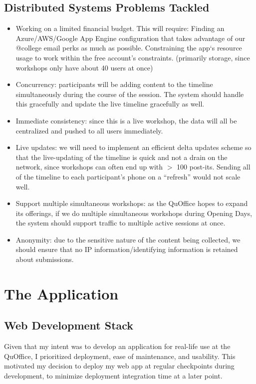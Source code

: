 \documentclass[12pt] {article}
\begin{document}
\subsection{Distributed Systems Problems Tackled}

\begin{itemize}
    \item Working on a limited financial budget. This will require: 
Finding an Azure/AWS/Google App Engine configuration that takes advantage of our @college email perks as much as possible. 
Constraining the app`s resource usage to work within the free account’s constraints. (primarily storage, since workshops only have about 40 users at once) 
    \item Concurrency: participants will be adding content to the timeline simultaneously during the course of the session. The system should handle this gracefully and update the live timeline gracefully as well. 
    \item Immediate consistency: since this is a live workshop, the data will all be centralized and pushed to all users immediately.
    \item Live updates: we will need to implement an efficient delta updates scheme so that the live-updating of the timeline is quick and not a drain on the network, since workshops can often end up with $>$ 100 post-its. Sending all of the timeline to each participant’s phone on a “refresh” would not scale well. 
    \item Support multiple simultaneous workshops: as the QuOffice hopes to expand its offerings, if we do multiple simultaneous workshops during Opening Days, the system should support traffic to multiple active sessions at once. 
    \item Anonymity: due to the sensitive nature of the content being collected, we should ensure that no IP information/identifying information is retained about submissions. 
\end{itemize}

\section{The Application}

\subsection{Web Development Stack}
Given that my intent was to develop an application for real-life use at the QuOffice, I prioritized deployment, ease of maintenance, and usability. This motivated my decision to deploy my web app at regular checkpoints during development, to minimize deployment integration time at a later point. 
\end{document}
